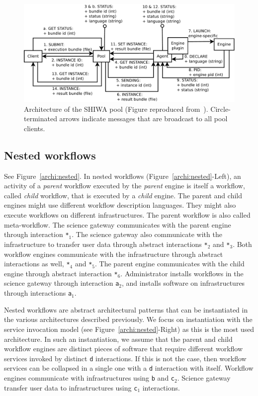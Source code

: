 \documentclass[preprint,3p,twocolumn]{elsarticle}
\begin{document}
\begin{figure}
\centering
\includegraphics[width=1.5\columnwidth]{figures/pool-interactions.pdf}
\caption{Architecture of the SHIWA pool (Figure reproduced
  from~\cite{ROGE-13}). Circle-terminated arrows indicate messages
  that are broadcast to all pool clients.}
\label{fig:shiwa-pool-architecture}
\end{figure}


\subsection{Nested workflows}

See Figure~\ref{archi:nested}. In nested workflows (Figure~\ref{archi:nested}-Left), an activity of a
\emph{parent} workflow executed by the \emph{parent} engine is itself
a workflow, called \emph{child} workflow, that is executed by a \emph{child} engine. The
parent and child engines might use different workflow description
languages. They might also execute workflows on different
infrastructures. The parent workflow is also called meta-workflow. The
science gateway communicates with the parent engine through
interaction \texttt{*$_1$}. The science gateway also communicate with
the infrastructure to transfer user data through abstract interactions
\texttt{*$_2$} and \texttt{*$_3$}. Both workflow engines communicate
with the infrastructure through abstract interactions as well,
\texttt{*$_4$} and \texttt{*$_5$}. The parent engine communicates with
the child engine through abstract interaction
\texttt{*$_6$}. Administrator installs workflows in the science
gateway through interaction \texttt{a$_2$}, and installs software on
infrastructures through interactions \texttt{a$_1$}.

Nested workflows are abstract architectural patterns that can be
instantiated in the various architectures described previously. We
focus on instantiation with the service invocation model (see
Figure~\ref{archi:nested}-Right) as this is the most used
architecture. In such an instantiation, we assume that the parent and
child workflow engines are distinct pieces of software that require
different workflow services invoked by distinct \texttt{d}
interactions. If this is not the case, then workflow services can be
collapsed in a single one with a \texttt{d} interaction with
itself. Workflow engines communicate with infrastructures using
\texttt{b} and \texttt{c$_2$}. Science gateway transfer user data to
infrastructures using \texttt{c$_1$} interactions.
\end{document}
